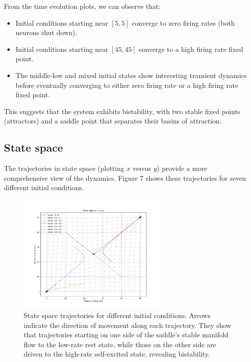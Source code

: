 \documentclass{article}
\begin{document}
From the time evolution plots, we can observe that:
\begin{itemize}
    \item Initial conditions starting near $[5, 5]$ converge to zero firing rates (both neurons shut down).
    \item Initial conditions starting near $[45, 45]$ converge to a high firing rate fixed point.
    \item The middle-low and mixed initial states show interesting transient dynamics before eventually converging to either zero firing rate or a high firing rate fixed point.
\end{itemize}

This suggests that the system exhibits bistability, with two stable fixed points (attractors) and a saddle point that separates their basins of attraction.

\subsection{State space}


The trajectories in state space (plotting $x$ versus $y$) provide a more comprehensive view of the dynamics. Figure 7 shows these trajectories for seven different initial conditions.

\begin{figure}[H]
    \centering
    \includegraphics[width=0.65\textwidth]{state_space2.png}
    \caption{State space trajectories for different initial conditions. Arrows indicate the direction of movement along each trajectory. They show that trajectories starting on one side of the saddle’s stable manifold flow to the low-rate rest state, while those on the other side are driven to the high-rate self-excited state, revealing bistability.}
    \label{fig:state_space}
\end{figure}
\end{document}
